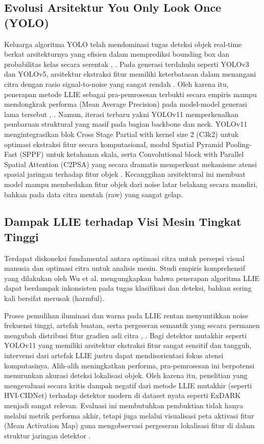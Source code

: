 ﻿\documentclass[conference]{IEEEtran}
\begin{document}
\subsection{Evolusi Arsitektur You Only Look Once (YOLO)} Keluarga algoritma YOLO telah mendominasi tugas deteksi objek real-time berkat arsitekturnya yang efisien dalam memprediksi bounding box dan probabilitas kelas secara serentak \cite{terven2023yoloreview}, \cite{sapkota2025yoloreview}. Pada generasi terdahulu seperti YOLOv3 dan YOLOv5, arsitektur ekstraksi fitur memiliki keterbatasan dalam menangani citra dengan rasio signal-to-noise yang sangat rendah \cite{wang2023yolov5lowlight}. Oleh karena itu, penerapan metode LLIE sebagai pra-pemrosesan terbukti secara empiris mampu mendongkrak performa (Mean Average Precision) pada model-model generasi lama tersebut \cite{shovo2024lowlight}, \cite{peng2024yolov5llie}.
Namun, iterasi terbaru yakni YOLOv11 memperkenalkan pembaruan struktural yang masif pada bagian backbone dan neck. YOLOv11 mengintegrasikan blok Cross Stage Partial with kernel size 2 (C3k2) untuk optimasi ekstraksi fitur secara komputasional, modul Spatial Pyramid Pooling-Fast (SPPF) untuk ketahanan skala, serta Convolutional block with Parallel Spatial Attention (C2PSA) yang secara dramatis memperkuat mekanisme atensi spasial jaringan terhadap fitur objek \cite{khanam2024yolov11}. Kecanggihan arsitektural ini membuat model mampu membedakan fitur objek dari noise latar belakang secara mandiri, bahkan pada data citra mentah (raw) yang sangat gelap.

\subsection{Dampak LLIE terhadap Visi Mesin Tingkat Tinggi} Terdapat diskoneksi fundamental antara optimasi citra untuk persepsi visual manusia dan optimasi citra untuk analisis mesin. Studi empiris komprehensif yang dilakukan oleh Wu et al. \cite{wu2024llieeffect} mengungkapkan bahwa penerapan algoritma LLIE dapat berdampak inkonsisten pada tugas klasifikasi dan deteksi, bahkan sering kali bersifat merusak (harmful).

Proses pemulihan iluminasi dan warna pada LLIE rentan menyuntikkan noise frekuensi tinggi, artefak buatan, serta pergeseran semantik yang secara permanen mengubah distribusi fitur gradien asli citra \cite{wang2023yolov5lowlight}, \cite{gong2025multiscale}. Bagi detektor mutakhir seperti YOLOv11 yang memiliki arsitektur ekstraksi fitur sangat sensitif dan tangguh, intervensi dari artefak LLIE justru dapat mendisorientasi fokus atensi komputasinya. Alih-alih meningkatkan performa, pra-pemrosesan ini berpotensi menurunkan akurasi deteksi lokalisasi objek. Oleh karena itu, penelitian yang mengevaluasi secara kritis dampak negatif dari metode LLIE mutakhir (seperti HVI-CIDNet) terhadap detektor modern di dataset nyata seperti ExDARK \cite{loh2019exdark} menjadi sangat relevan. Evaluasi ini membutuhkan pembuktian tidak hanya melalui metrik performa akhir, tetapi juga melalui visualisasi peta aktivasi fitur (Mean Activation Map) guna mengobservasi pergeseran lokalisasi fitur di dalam struktur jaringan detektor \cite{metrics2026formulas}.
\end{document}
